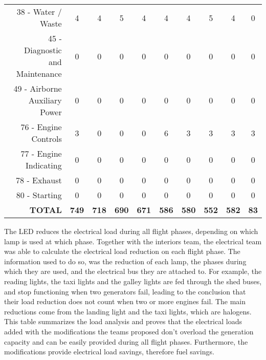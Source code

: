 \begin{table}[htbp]
\begin{tabular}{rccccccccc}
    38 - Water / Waste & 4     & 4     & 5     & 4     & 4     & 4     & 5     & 4     & 0 \\
    45 - Diagnostic and Maintenance & 0     & 0     & 0     & 0     & 0     & 0     & 0     & 0     & 0 \\
    49 - Airborne Auxiliary Power & 0     & 0     & 0     & 0     & 0     & 0     & 0     & 0     & 0 \\
    76 - Engine Controls & 3     & 0     & 0     & 0     & 6     & 3     & 3     & 3     & 3 \\
    77 - Engine Indicating & 0     & 0     & 0     & 0     & 0     & 0     & 0     & 0     & 0 \\
    78 - Exhaust & 0     & 0     & 0     & 0     & 0     & 0     & 0     & 0     & 0 \\
    80 - Starting & 0     & 0     & 0     & 0     & 0     & 0     & 0     & 0     & 0 \\
    \textbf{TOTAL} & \textbf{749} & \textbf{718} & \textbf{690} & \textbf{671} & \textbf{586} & \textbf{580} & \textbf{552} & \textbf{582} & \textbf{83} \\
    \bottomrule
    \end{tabular}%
  \label{tab:NewEleLoads}%
\end{table}%

The LED reduces the electrical load during all flight phases, depending on which lamp is used at which phase. Together with the interiors team, the electrical team was able to calculate the electrical load reduction on each flight phase. The information used to do so, was the reduction of each lamp, the phases during which they are used, and the electrical bus they are attached to. For example, the reading lights, the taxi lights and the galley lights are fed through the shed buses, and stop functioning when two generators fail, leading to the conclusion that their load reduction does not count when two or more engines fail. The main reductions come from the landing light and the taxi lights, which are halogens. 
This table summarizes the load analysis and proves that the electrical loads added with the modifications the teams proposed don't overload the generation capacity and can be easily provided during all flight phases. Furthermore, the modifications provide electrical load savings, therefore fuel savings. 